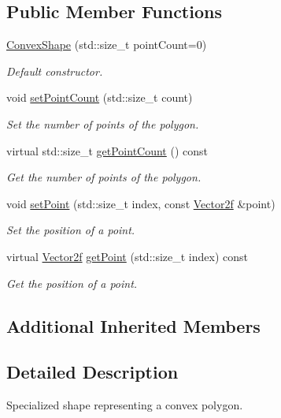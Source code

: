 \subsection*{Public Member Functions}
\begin{DoxyCompactItemize}
\item 
\hyperlink{classsf_1_1_convex_shape_af9981b8909569b381b3fccf32fc69856}{Convex\+Shape} (std\+::size\+\_\+t point\+Count=0)
\begin{DoxyCompactList}\small\item\em Default constructor. \end{DoxyCompactList}\item 
void \hyperlink{classsf_1_1_convex_shape_a56e6e79ade6dd651cc1a0e39cb68deae}{set\+Point\+Count} (std\+::size\+\_\+t count)
\begin{DoxyCompactList}\small\item\em Set the number of points of the polygon. \end{DoxyCompactList}\item 
virtual std\+::size\+\_\+t \hyperlink{classsf_1_1_convex_shape_a0c54b8d48fe4e13414f6e667dbfc22a3}{get\+Point\+Count} () const
\begin{DoxyCompactList}\small\item\em Get the number of points of the polygon. \end{DoxyCompactList}\item 
void \hyperlink{classsf_1_1_convex_shape_a5929e0ab0ba5ca1f102b40c234a8e92d}{set\+Point} (std\+::size\+\_\+t index, const \hyperlink{classsf_1_1_vector2}{Vector2f} \&point)
\begin{DoxyCompactList}\small\item\em Set the position of a point. \end{DoxyCompactList}\item 
virtual \hyperlink{classsf_1_1_vector2}{Vector2f} \hyperlink{classsf_1_1_convex_shape_a72a97bc426d8daf4d682a20fcb7f3fe7}{get\+Point} (std\+::size\+\_\+t index) const
\begin{DoxyCompactList}\small\item\em Get the position of a point. \end{DoxyCompactList}\end{DoxyCompactItemize}
\subsection*{Additional Inherited Members}


\subsection{Detailed Description}
Specialized shape representing a convex polygon. 

